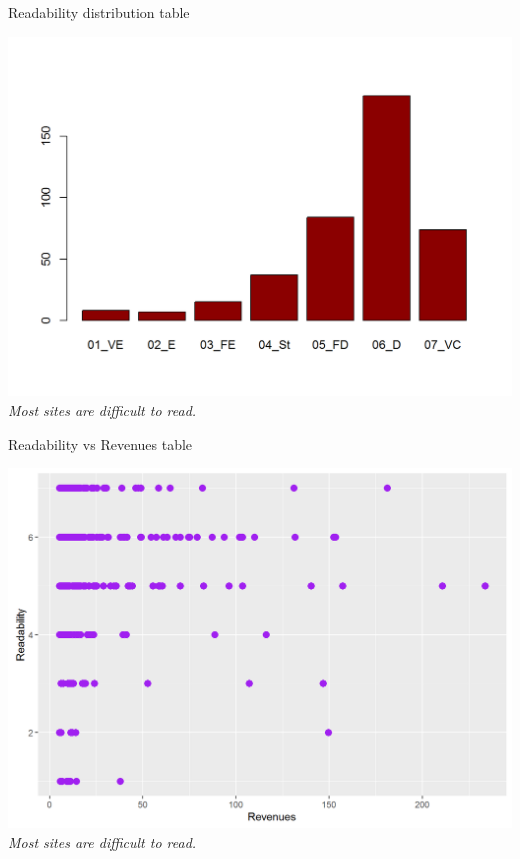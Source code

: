\documentclass{article}
\begin{document}
\begin{table}[H]
\centering
\caption{Readability distribution table}
\begin{center}
\includegraphics[scale=0.5]{../R/photos/41_read_dist.png}    \\
\textit{Most sites are difficult to read.}
\end{center}
\end{table}
\begin{table}[H]
\centering
\caption{Readability vs Revenues table}
\begin{center}
\includegraphics[scale=0.5]{../R/photos/42_read_rev.png}   \\
\textit{Most sites are difficult to read.}
\end{center}
\end{table}
\end{document}
